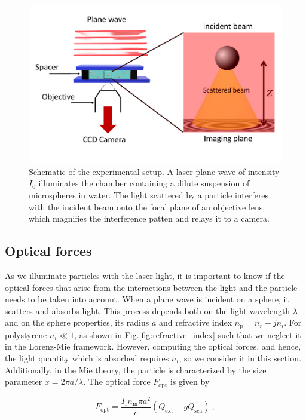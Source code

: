 \begin{figure}[!ht]
	\centering
	\includegraphics[scale=0.9]{02_body/chapter2/images/figures_setup/schema_setup.pdf}
	\caption{Schematic of the experimental setup. A laser plane wave of intensity $I_0$ illuminates the chamber containing a dilute suspension of microspheres in water. The light scattered by a particle interferes with the incident beam onto the focal plane of an objective lens, which magnifies the interference patten and relays it to a camera.}
	\label{fig:schema}
\end{figure}


\subsection{Optical forces}

As we illuminate particles with the laser light, it is important to know if the optical forces that arise from the interactions between the light and the particle needs to be taken into account. When a plane wave is incident on a sphere, it scatters and absorbs light. This process depends both on the light wavelength $\lambda$ and on the sphere properties, its radius $a$ and refractive index $n_\mathrm{p} = n_{r} - jn_i$. For polystyrene $n_i \ll 1$, as shown in Fig.\ref{fig:refractive_index} such that we neglect it in the Lorenz-Mie framework. However, computing the optical forces, and hence, the light quantity which is absorbed requires $n_i$, so we consider it in this section. Additionally, in the Mie theory, the particle is characterized by the size parameter $\tilde{x}= 2\pi a /\lambda$. The optical force $F_\mathrm{opt}$ is given by \cite{f_bohren_absorption_1998}

\begin{equation}
	F_\mathrm{opt} = \frac{I_\mathrm{r} n_\mathrm{m} \pi a^2 }{c} (Q_\mathrm{ext} - gQ_\mathrm{sca}) ~,
	\label{Eq.Fopt}
\end{equation}

